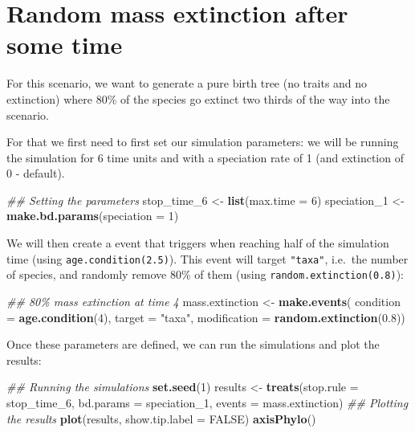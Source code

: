 \documentclass[
]{book}
\newenvironment{Shaded}{\begin{snugshade}}{\end{snugshade}}
\newcommand{\CommentTok}[1]{\textcolor[rgb]{0.56,0.35,0.01}{\textit{#1}}}
\newcommand{\DataTypeTok}[1]{\textcolor[rgb]{0.13,0.29,0.53}{#1}}
\newcommand{\DecValTok}[1]{\textcolor[rgb]{0.00,0.00,0.81}{#1}}
\newcommand{\FloatTok}[1]{\textcolor[rgb]{0.00,0.00,0.81}{#1}}
\newcommand{\KeywordTok}[1]{\textcolor[rgb]{0.13,0.29,0.53}{\textbf{#1}}}
\newcommand{\NormalTok}[1]{#1}
\newcommand{\OtherTok}[1]{\textcolor[rgb]{0.56,0.35,0.01}{#1}}
\newcommand{\StringTok}[1]{\textcolor[rgb]{0.31,0.60,0.02}{#1}}
\begin{document}
\hypertarget{EGrandom_ext}{%
\section{Random mass extinction after some time}\label{EGrandom_ext}}

For this scenario, we want to generate a pure birth tree (no traits and no extinction) where 80\% of the species go extinct two thirds of the way into the scenario.

For that we first need to first set our simulation parameters: we will be running the simulation for 6 time units and with a speciation rate of 1 (and extinction of 0 - default).

\begin{Shaded}
\begin{Highlighting}[]
\CommentTok{\#\# Setting the parameters}
\NormalTok{stop\_time\_}\DecValTok{6}\NormalTok{ \textless{}{-}}\StringTok{ }\KeywordTok{list}\NormalTok{(}\DataTypeTok{max.time =} \DecValTok{6}\NormalTok{)}
\NormalTok{speciation\_}\DecValTok{1}\NormalTok{ \textless{}{-}}\StringTok{ }\KeywordTok{make.bd.params}\NormalTok{(}\DataTypeTok{speciation =} \DecValTok{1}\NormalTok{)}
\end{Highlighting}
\end{Shaded}

We will then create a event that triggers when reaching half of the simulation time (using \texttt{age.condition(2.5)}).
This event will target \texttt{"taxa"}, i.e.~the number of species, and randomly remove 80\% of them (using \texttt{random.extinction(0.8)}):

\begin{Shaded}
\begin{Highlighting}[]
\CommentTok{\#\# 80\% mass extinction at time 4}
\NormalTok{mass.extinction \textless{}{-}}\StringTok{ }\KeywordTok{make.events}\NormalTok{(}
                    \DataTypeTok{condition =} \KeywordTok{age.condition}\NormalTok{(}\DecValTok{4}\NormalTok{),}
                    \DataTypeTok{target =} \StringTok{"taxa"}\NormalTok{,}
                    \DataTypeTok{modification =} \KeywordTok{random.extinction}\NormalTok{(}\FloatTok{0.8}\NormalTok{))}
\end{Highlighting}
\end{Shaded}

Once these parameters are defined, we can run the simulations and plot the results:

\begin{Shaded}
\begin{Highlighting}[]
\CommentTok{\#\# Running the simulations}
\KeywordTok{set.seed}\NormalTok{(}\DecValTok{1}\NormalTok{)}
\NormalTok{results \textless{}{-}}\StringTok{ }\KeywordTok{treats}\NormalTok{(}\DataTypeTok{stop.rule =}\NormalTok{ stop\_time\_}\DecValTok{6}\NormalTok{,}
                \DataTypeTok{bd.params =}\NormalTok{ speciation\_}\DecValTok{1}\NormalTok{,}
                \DataTypeTok{events    =}\NormalTok{ mass.extinction)}
\CommentTok{\#\# Plotting the results}
\KeywordTok{plot}\NormalTok{(results, }\DataTypeTok{show.tip.label =} \OtherTok{FALSE}\NormalTok{)}
\KeywordTok{axisPhylo}\NormalTok{()}
\end{Highlighting}
\end{Shaded}
\end{document}
